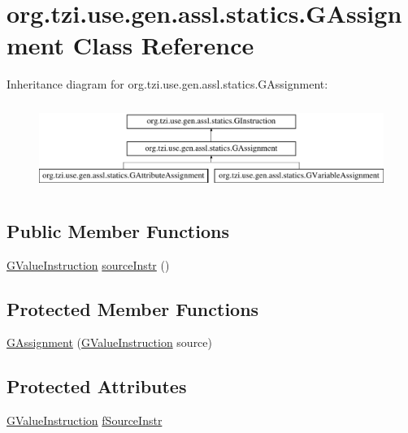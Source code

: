 \hypertarget{classorg_1_1tzi_1_1use_1_1gen_1_1assl_1_1statics_1_1_g_assignment}{\section{org.\-tzi.\-use.\-gen.\-assl.\-statics.\-G\-Assignment Class Reference}
\label{classorg_1_1tzi_1_1use_1_1gen_1_1assl_1_1statics_1_1_g_assignment}
}
Inheritance diagram for org.\-tzi.\-use.\-gen.\-assl.\-statics.\-G\-Assignment\-:\begin{figure}[H]
\begin{center}
\leavevmode
\includegraphics[height=2.857143cm]{classorg_1_1tzi_1_1use_1_1gen_1_1assl_1_1statics_1_1_g_assignment}
\end{center}
\end{figure}
\subsection*{Public Member Functions}
\begin{DoxyCompactItemize}
\item 
\hyperlink{interfaceorg_1_1tzi_1_1use_1_1gen_1_1assl_1_1statics_1_1_g_value_instruction}{G\-Value\-Instruction} \hyperlink{classorg_1_1tzi_1_1use_1_1gen_1_1assl_1_1statics_1_1_g_assignment_a02b5780dc7c85dd4ef76d0a5c15cec4b}{source\-Instr} ()
\end{DoxyCompactItemize}
\subsection*{Protected Member Functions}
\begin{DoxyCompactItemize}
\item 
\hyperlink{classorg_1_1tzi_1_1use_1_1gen_1_1assl_1_1statics_1_1_g_assignment_a341f8fed99f5d465a79e42f80787f778}{G\-Assignment} (\hyperlink{interfaceorg_1_1tzi_1_1use_1_1gen_1_1assl_1_1statics_1_1_g_value_instruction}{G\-Value\-Instruction} source)
\end{DoxyCompactItemize}
\subsection*{Protected Attributes}
\begin{DoxyCompactItemize}
\item 
\hyperlink{interfaceorg_1_1tzi_1_1use_1_1gen_1_1assl_1_1statics_1_1_g_value_instruction}{G\-Value\-Instruction} \hyperlink{classorg_1_1tzi_1_1use_1_1gen_1_1assl_1_1statics_1_1_g_assignment_a32c4a99cfac30f4b32ea743d6cc0ace1}{f\-Source\-Instr}
\end{DoxyCompactItemize}


